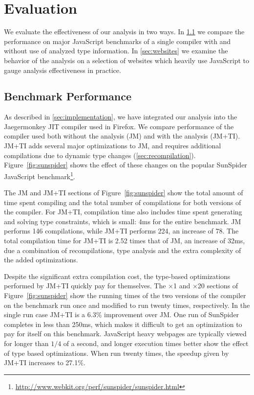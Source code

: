 \section{Evaluation}
\label{sec:evaluation}

We evaluate the effectiveness of our analysis in two ways.
In \Section\ref{sec:benchmarks} we compare the performance on major JavaScript benchmarks
of a single compiler with and without use of analyzed type information.
In \Section\ref{sec:websites} we examine the behavior of the analysis on a selection of
websites which heavily use JavaScript to gauge analysis effectiveness in practice.

\subsection{Benchmark Performance}
\label{sec:benchmarks}


As described in \Section\ref{sec:implementation}, we have integrated our analysis into
the Jaegermonkey JIT compiler used in Firefox.
We compare performance of the compiler used both without the analysis (JM)
and with the analysis (JM+TI).
JM+TI adds several major optimizations to JM,
and requires additional compilations due to dynamic type changes
(\Section\ref{sec:recompilation}).
Figure~\ref{fig:sunspider} shows the effect of these changes on the popular
SunSpider JavaScript benchmark\footnote{\url{http://www.webkit.org/perf/sunspider/sunspider.html}}.

The JM and JM+TI sections of Figure~\ref{fig:sunspider} show the total amount of time
spent compiling and the total number of compilations for both versions of
the compiler.
For JM+TI, compilation time also includes time spent generating and solving
type constraints, which is small: 4ms for the entire benchmark.
JM performs 146 compilations, while JM+TI performs 224, an increase of 78.
The total compilation time for JM+TI is 2.52 times that of JM, an increase
of 32ms, due a combination of recompilations, type analysis and the extra
complexity of the added optimizations.

Despite the significant extra compilation cost, the type-based optimizations
performed by JM+TI quickly pay for themselves. The $\times$1 and
$\times$20 sections
of Figure~\ref{fig:sunspider} show the running times of the two versions of the
compiler on the benchmark run once and modified to run twenty times,
respectively.
In the single run case JM+TI is a 6.3\% improvement over JM.
One run of SunSpider completes in less than 250ms, which makes it
difficult to get an optimization to pay for itself on this benchmark.
JavaScript heavy webpages are typically viewed for longer than
$1/4$ of a second, and longer execution times better show the effect
of type based optimizations.
When run twenty times, the speedup given by JM+TI increases to 27.1\%.

